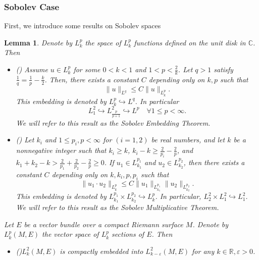 \documentclass[a4paper]{amsart}
\newtheorem{lemma}[theorem]{Lemma}
\theoremstyle{definition}
\theoremstyle{remark}
\numberwithin{equation}{section}
\begin{document}
\subsubsection{Sobolev Case}
First, we introduce some results on Sobolev spaces
\begin{lemma}\label{Sob property}
Denote by $L_k^p$ the space of $L_k^p$ functions defined on the unit disk in $\mathbb{C}$. Then
\begin{itemize}

    \item[$(1)$] \rm{(\cite[Theorem~6.7]{di2012hitchhikers})} Assume $u \in L_k^p$ for some $0<k<1$ and $1 < p < \frac{2}{k}$. Let $q > 1$ satisfy $\frac{1}{q} = \frac{1}{p} - \frac{k}{2}$. Then, there exists a constant $C$ depending only on $k, p$ such that
\[
\|u\|_{L^q} \leq C \|u\|_{L_k^p}.
\]
This embedding is denoted by $L_k^p \hookrightarrow L^q$. In particular
\[
L_1^2 \hookrightarrow L_{\frac{p}{p+1}}^2 \hookrightarrow L^p\quad\forall1 \leq p < \infty.
\]
We will refer to this result as the \textit{Sobolev Embedding Theorem}.

    \item[$(2)$] \rm{(\cite[Theorem 6.1]{behzadan2021multiplication})} Let $k_i$ and $1 \leq p_i, p < \infty$ for $(i = 1, 2)$ be real numbers, and let $k$ be a nonnegative integer such that $k_i \geq k$, $k_i - k \geq \frac{2}{p_i} - \frac{2}{p}$, and $k_1 + k_2 - k > \frac{2}{p_1} + \frac{2}{p_2} - \frac{2}{p} \geq 0$. If $u_1 \in L_{k_1}^{p_1}$ and $u_2 \in L_{k_2}^{p_2}$, then there exists a constant $C$ depending only on $k, k_i, p, p_i$ such that 
\[
\|u_1 \cdot u_2\|_{L_k^p} \leq C \|u_1\|_{L_{k_1}^{p_1}} \|u_2\|_{L_{k_2}^{p_2}}.
\] 
This embedding is denoted by $L_{k_1}^{p_1} \times L_{k_2}^{p_2} \hookrightarrow L_k^p$. In particular, $L_2^2 \times L_1^2 \hookrightarrow L_1^2$. We will refer to this result as the \textit{Sobolev Multiplicative Theorem}.

\end{itemize}
Let $E$ be a vector bundle over a compact Riemann surface $M$. Denote by $L_k^p(M, E)$ the vector space of $L_k^p$ sections of $E$. Then
\begin{itemize}
    \item[$(3)$] {\rm (\cite[Chapter~4, Proposition~4.4]{taylorpartial})}$L_k^2(M, E)$ is compactly embedded into $L_{k-\varepsilon}^2(M, E)$ for any $k \in \mathbb{R}, \varepsilon>0$. 
\end{itemize}
\end{lemma}
\end{document}
